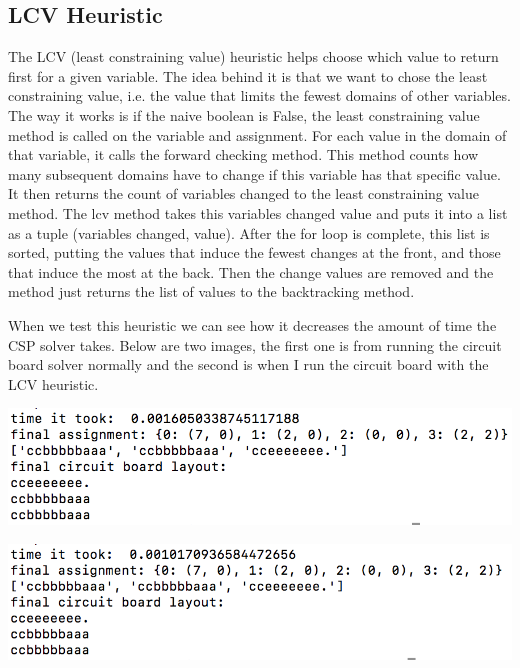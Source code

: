 \documentclass{article}
\begin{document}
\subsection{LCV Heuristic}
The LCV (least constraining value) heuristic helps choose which value to return first for a given variable. The idea behind it is that we want to chose the least constraining value, i.e. the value that limits the fewest domains of other variables. The way it works is if the naive boolean is False, the least constraining value method is called on the variable and assignment. For each value in the domain of that variable, it calls the forward checking method. This method counts how many subsequent domains have to change if this variable has that specific value. It then returns the count of variables changed to the least constraining value method. The lcv method takes this variables changed value and puts it into a list as a tuple (variables changed, value). After the for loop is complete, this list is sorted, putting the values that induce the fewest changes at the front, and those that induce the most at the back. Then the change values are removed and the method just returns the list of values to the backtracking method.

When we test this heuristic we can see how it decreases the amount of time the CSP solver takes. Below are two images, the first one is from running the circuit board solver normally and the second is when I run the circuit board with the LCV heuristic. 

\includegraphics[width=\textwidth]{CircuitBoard_withoutLCV.png}

\includegraphics[width=\textwidth]{CircuitBoard_withLCV.png}
\end{document}
